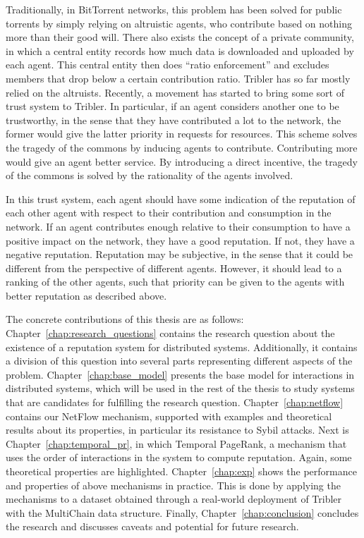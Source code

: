 \documentclass[a4paper,11pt]{book}
\theoremstyle{definition}
\begin{document}
Traditionally, in BitTorrent networks, this problem has been solved for public torrents
by simply relying on altruistic agents, who contribute based on nothing more than
their good will. There also exists the concept of a private community, in which a central
entity records how much data is downloaded and uploaded by each agent. This central
entity then does ``ratio enforcement'' and excludes members that drop below a certain
contribution ratio. Tribler has so far mostly relied on the altruists. 
Recently, a movement has started to bring some sort of trust system to Tribler. In particular,
if an agent considers another one to be trustworthy, in the sense that they have contributed
a lot to the network, the former would give the latter priority in requests for resources.
This scheme solves the tragedy of the commons by inducing agents to contribute. Contributing
more would give an agent better service. By introducing a direct incentive, the tragedy
of the commons is solved by the rationality of the agents involved.

In this trust system, each agent should have some indication of the reputation of each other agent
with respect to their contribution and consumption in the network. If an agent contributes
enough relative to their consumption to have a positive impact on the network, they have
a good reputation. If not, they have a negative reputation. Reputation may be subjective, in
the sense that it could be different from the perspective of different agents. However,
it should lead to a ranking of the other agents, such that priority can be given to the
agents with better reputation as described above. 

The concrete contributions of this thesis are as follows: Chapter~\ref{chap:research_questions} contains
the research question about the existence of a reputation system for distributed systems.
Additionally, it contains a division of this question into several parts representing different aspects of the problem.
Chapter~\ref{chap:base_model} presents the base model for interactions in distributed systems, which will
be used in the rest of the thesis to study systems that are candidates for fulfilling the research question.
Chapter~\ref{chap:netflow} contains our NetFlow mechanism, supported with examples and theoretical results
about its properties, in particular its resistance to Sybil attacks. Next is Chapter~\ref{chap:temporal_pr}, 
in which Temporal PageRank, a mechanism that uses the order of interactions in the system to compute reputation.
Again, some theoretical properties are highlighted. Chapter~\ref{chap:exp} shows the performance and properties
of above mechanisms in practice. This is done by applying the mechanisms to a dataset obtained through
a real-world deployment of Tribler with the MultiChain data structure. Finally, Chapter~\ref{chap:conclusion}
concludes the research and discusses caveats and potential for future research.
\end{document}
